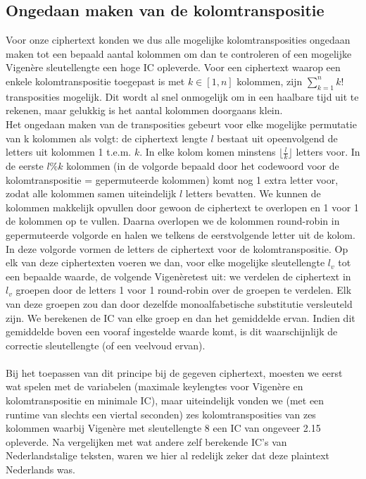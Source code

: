 \subsection{Ongedaan maken van de kolomtranspositie}
Voor onze ciphertext konden we dus alle mogelijke kolomtransposities ongedaan maken tot een bepaald aantal kolommen om dan te controleren of een mogelijke Vigen\`ere sleutellengte een hoge IC opleverde. Voor een ciphertext waarop een enkele kolomtranspositie toegepast is met $k \in [1,n]$ kolommen, zijn $\sum_{k=1}^{n}k!$ transposities mogelijk. Dit wordt al snel onmogelijk om in een haalbare tijd uit te rekenen, maar gelukkig is het aantal kolommen doorgaans klein. \\
Het ongedaan maken van de transposities gebeurt voor elke mogelijke permutatie van k kolommen als volgt: de ciphertext lengte $l$ bestaat uit opeenvolgend de letters uit kolommen 1 t.e.m. $k$. In elke kolom komen minstens $\lfloor\frac{l}{k}\rfloor$ letters voor. In de eerste $l\%k$ kolommen (in de volgorde bepaald door het codewoord voor de kolomtranspositie = gepermuteerde kolommen) komt nog 1 extra letter voor, zodat alle kolommen samen uiteindelijk $l$ letters bevatten. We kunnen de kolommen makkelijk opvullen door gewoon de ciphertext te overlopen en 1 voor 1 de kolommen op te vullen. Daarna overlopen we de kolommen round-robin in gepermuteerde volgorde en halen we telkens de eerstvolgende letter uit de kolom. In deze volgorde vormen de letters de ciphertext voor de kolomtranspositie. Op elk van deze ciphertexten voeren we dan, voor elke mogelijke sleutellengte $l_v$ tot een bepaalde waarde, de volgende Vigen\`eretest uit: we verdelen de ciphertext in $l_v$ groepen door de letters 1 voor 1 round-robin over de groepen te verdelen. Elk van deze groepen zou dan door dezelfde monoalfabetische substitutie versleuteld zijn. We berekenen de IC van elke groep en dan het gemiddelde ervan. Indien dit gemiddelde boven een vooraf ingestelde waarde komt, is dit waarschijnlijk de correctie sleutellengte (of een veelvoud ervan). \\ \\ Bij het toepassen van dit principe bij de gegeven ciphertext, moesten we eerst wat spelen met de variabelen (maximale keylengtes voor Vigen\`ere en kolomtranspositie en minimale IC), maar uiteindelijk vonden we (met een runtime van slechts een viertal seconden) zes kolomtransposities van zes kolommen waarbij Vigen\`ere met sleutellengte 8 een IC van ongeveer 2.15 opleverde. Na vergelijken met wat andere zelf berekende IC's van Nederlandstalige teksten, waren we hier al redelijk zeker dat deze plaintext Nederlands was. 

